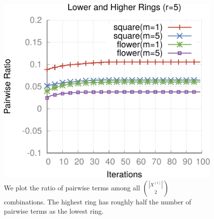 \documentclass[smallextended]{svjour3}       %
\begin{document}
{{\begin{figure}
\center
\includegraphics[scale=0.5]{optimization_pairwise-ratio_plot-pairwiseratio-lowerHigher-concavities-probe.pdf}
\caption{We plot the ratio of pairwise terms among all $\binom{|X^{(i)}|}{2}$ combinations. The highest ring has roughly half the number of pairwise terms as the lowest ring.}
\label{fig:ratio-pairwise-terms}
\end{figure}


}}
\end{document}
